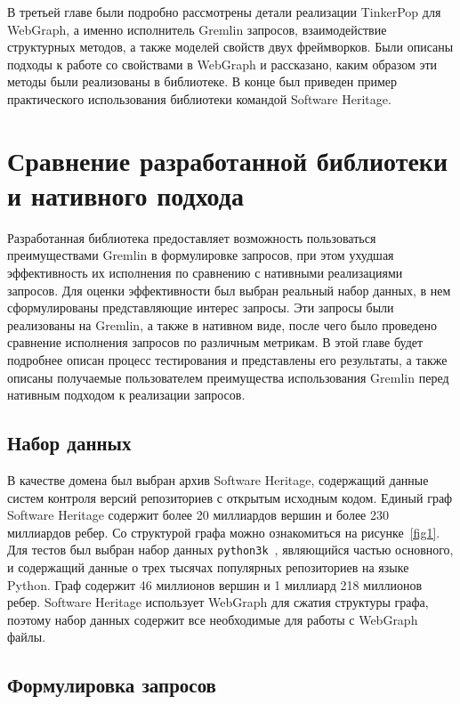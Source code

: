 \documentclass[times,specification,annotation]{itmo-student-thesis}
\begin{document}
\chapterconclusion

В третьей главе были подробно рассмотрены детали реализации TinkerPop для WebGraph, а именно исполнитель Gremlin запросов, взаимодействие структурных методов, а также моделей свойств двух фреймворков. Были описаны подходы к работе со свойствами в WebGraph и рассказано, каким образом эти методы были реализованы в библиотеке. В конце был приведен пример практического использования библиотеки командой Software Heritage.

\chapter{Сравнение разработанной библиотеки и нативного подхода}

Разработанная библиотека предоставляет возможность пользоваться преимуществами Gremlin в формулировке запросов, при этом ухудшая эффективность их исполнения по сравнению с нативными реализациями запросов. Для оценки эффективности был выбран реальный набор данных, в нем сформулированы представляющие интерес запросы. Эти запросы были реализованы на Gremlin, а также в нативном виде, после чего было проведено сравнение исполнения запросов по различным метрикам. В этой главе будет подробнее описан процесс тестирования и представлены его результаты, а также описаны получаемые пользователем преимущества использования Gremlin перед нативным подходом к реализации запросов.

\section{Набор данных}

В качестве домена был выбран архив Software Heritage, содержащий данные систем контроля версий репозиториев с открытым исходным кодом. Единый граф Software Heritage содержит более 20 миллиардов вершин и более 230 миллиардов ребер. Со структурой графа можно ознакомиться на рисунке~\ref{fig1}. Для тестов был выбран набор данных \texttt{python3k}~\cite{swh-dataset}, являющийся частью основного, и содержащий данные о трех тысячах популярных репозиториев на языке Python. Граф содержит 46 миллионов вершин и 1 миллиард 218 миллионов ребер. Software Heritage использует WebGraph для сжатия структуры графа, поэтому набор данных содержит все необходимые для работы с WebGraph файлы.

\section{Формулировка запросов}
\end{document}
